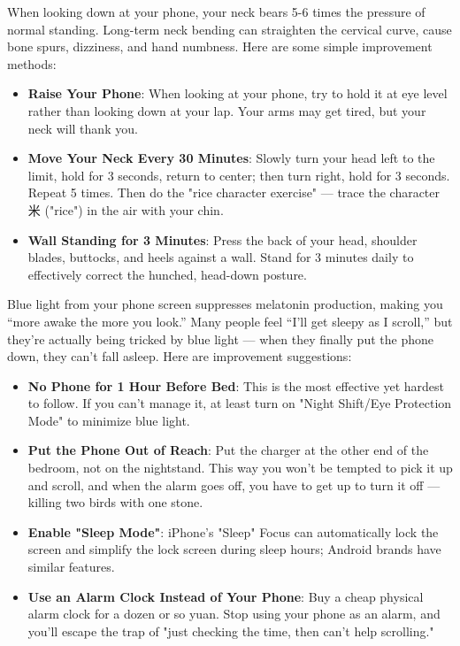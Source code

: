 
When looking down at your phone, your neck bears 5-6 times the pressure of normal standing. Long-term neck bending can straighten the cervical curve, cause bone spurs, dizziness, and hand numbness. Here are some simple improvement methods:

\begin{itemize}
  \item \textbf{Raise Your Phone}: When looking at your phone, try to hold it at eye level rather than looking down at your lap. Your arms may get tired, but your neck will thank you.
  \item \textbf{Move Your Neck Every 30 Minutes}: Slowly turn your head left to the limit, hold for 3 seconds, return to center; then turn right, hold for 3 seconds. Repeat 5 times. Then do the "rice character exercise" — trace the character 米 ("rice") in the air with your chin.
  \item \textbf{Wall Standing for 3 Minutes}: Press the back of your head, shoulder blades, buttocks, and heels against a wall. Stand for 3 minutes daily to effectively correct the hunched, head-down posture.
\end{itemize}


Blue light from your phone screen suppresses melatonin production, making you “more awake the more you look.” Many people feel “I'll get sleepy as I scroll,” but they're actually being tricked by blue light — when they finally put the phone down, they can't fall asleep. Here are improvement suggestions:

\begin{itemize}
  \item \textbf{No Phone for 1 Hour Before Bed}: This is the most effective yet hardest to follow. If you can't manage it, at least turn on "Night Shift/Eye Protection Mode" to minimize blue light.
  \item \textbf{Put the Phone Out of Reach}: Put the charger at the other end of the bedroom, not on the nightstand. This way you won't be tempted to pick it up and scroll, and when the alarm goes off, you have to get up to turn it off — killing two birds with one stone.
  \item \textbf{Enable "Sleep Mode"}: iPhone's "Sleep" Focus can automatically lock the screen and simplify the lock screen during sleep hours; Android brands have similar features.
  \item \textbf{Use an Alarm Clock Instead of Your Phone}: Buy a cheap physical alarm clock for a dozen or so yuan. Stop using your phone as an alarm, and you'll escape the trap of "just checking the time, then can't help scrolling."
\end{itemize}

